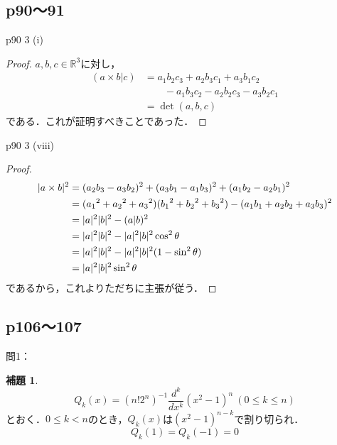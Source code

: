 \documentclass[dvipdfmx,uplatex,11pt]{jsarticle}
\DeclarePairedDelimiter\abs{\lvert}{\rvert}
\theoremstyle{definition}
\newtheorem{lemm}{補題}[section]
\begin{document}
\subsection{p90〜91}

p90 3 (i)
\begin{leftbar}
    \begin{proof}
    $a,b,c \in \mathbb{R}^3$に対し，
    \begin{align*}
        (a \times b |c) & = a_1 b_2 c_3 +a_2 b_3 c_1 + a_3 b_1 c_2 \\
        & \qquad - a_1 b_3 c_2 -a_2 b_2 c_3 - a_3 b_2 c_1 \\
        & =\det (a,b,c)
    \end{align*}
    である．これが証明すべきことであった．
\end{proof}
\end{leftbar}

p90 3 (viii)
\begin{leftbar}
    \begin{proof}
        \begin{align*}
            \abs{a \times b}^2 & = (a_2 b_3 -a_3 b_2)^2 + (a_3 b_1 - a_1 b_3)^2 + (a_1 b_2 - a_2 b_1)^2 \\
            & =({a_1}^2+{a_2}^2+{a_3}^2)({b_1}^2+{b_2}^2+{b_3}^2)-(a_1 b_1 + a_2 b_2 + a_3 b_3)^2 \\
            & = \abs{a}^2 \abs{b}^2 -(a|b)^2 \\
            & = \abs{a}^2 \abs{b}^2 - \abs{a}^2\abs{b}^2 \cos^2 \theta \\
            & = \abs{a}^2 \abs{b}^2 - \abs{a}^2 \abs{b}^2 (1-\sin ^2 \theta) \\
            & = \abs{a}^2 \abs{b}^2 \sin ^2 \theta
        \end{align*}
        であるから，これよりただちに主張が従う．
    \end{proof}
\end{leftbar}

\newpage
\subsection{p106〜107}
問1：
\begin{lemm}
    \label{補題:p106.問1}
    \[
        Q_k (x)= (n! 2^n)^{-1} \frac{d^k}{dx^k} (x^2-1)^n~(0 \le k \le n)
    \]
とおく．$0 \le k <n$のとき，$Q_k (x)$は$(x^2-1)^{n-k}$で割り切られ．
\[
    Q_k (1)= Q_k(-1)=0
\]
\end{lemm}
\end{document}
